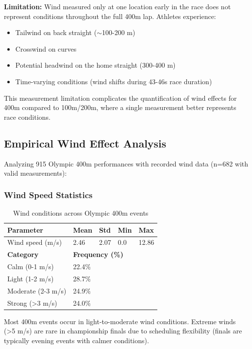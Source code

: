 \textbf{Limitation:} Wind measured only at one location early in the race does not represent conditions throughout the full 400m lap. Athletes experience:
\begin{itemize}
    \item Tailwind on back straight ($\sim$100-200 m)
    \item Crosswind on curves
    \item Potential headwind on the home straight (300-400 m)
    \item Time-varying conditions (wind shifts during 43-46s race duration)
\end{itemize}

This measurement limitation complicates the quantification of wind effects for 400m compared to 100m/200m, where a single measurement better represents race conditions.

\subsection{Empirical Wind Effect Analysis}

Analyzing 915 Olympic 400m performances with recorded wind data (n=682 with valid measurements):


\subsubsection{Wind Speed Statistics}

\begin{table}[H]
\centering
\caption{Wind conditions across Olympic 400m events}
\begin{tabular}{@{}lllll@{}}
\toprule
\textbf{Parameter} & \textbf{Mean} & \textbf{Std} & \textbf{Min} & \textbf{Max} \\
\midrule
Wind speed (m/s) & 2.46 & 2.07 & 0.0 & 12.86 \\
\midrule
\textbf{Category} & \multicolumn{4}{l}{\textbf{Frequency (\%)}} \\
\midrule
Calm (0-1 m/s) & \multicolumn{4}{l}{22.4\%} \\
Light (1-2 m/s) & \multicolumn{4}{l}{28.7\%} \\
Moderate (2-3 m/s) & \multicolumn{4}{l}{24.9\%} \\
Strong (>3 m/s) & \multicolumn{4}{l}{24.0\%} \\
\bottomrule
\end{tabular}
\end{table}

Most 400m events occur in light-to-moderate wind conditions. Extreme winds (>5 m/s) are rare in championship finals due to scheduling flexibility (finals are typically evening events with calmer conditions).

